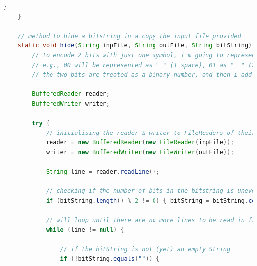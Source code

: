 \documentclass[a4paper]{article}
\begin{document}
\begin{lstlisting}[language=java]
        } 
    }
   
    // method to hide a bitstring in a copy the input file provided
    static void hide(String inpFile, String outFile, String bitString) {
        // to encode 2 bits with just one symbol, i'm going to represent the binary digits as an analog represenation of the number it represents plus one
        // e.g., 00 will be represented as " " (1 space), 01 as "  " (2 spaces), 10 as "   " (3 spaces), and 11 as "    " (4 spaces)
        // the two bits are treated as a binary number, and then i add one to said binary number to get the number of spaces that will represent that number

        BufferedReader reader;                                                  // declaring a BufferedReader for the input file 
        BufferedWriter writer;                                                  // declaring a BufferedWriter for the output file
	
        try {
            // initialising the reader & writer to FileReaders of their respective files (inpFile & outFile)
            reader = new BufferedReader(new FileReader(inpFile));       
            writer = new BufferedWriter(new FileWriter(outFile));
            
            String line = reader.readLine();                                    // reading in the first line from the input file

            // checking if the number of bits in the bitstring is uneven, and if so, adding a '0' onto the end 
            if (bitString.length() % 2 != 0) { bitString = bitString.concat("0"); }
            
            // will loop until there are no more lines to be read in from the input file (inpFile)
            while (line != null) {
               
                // if the bitString is not (yet) an empty String
                if (!bitString.equals("")) {


\end{lstlisting}
\end{document}
